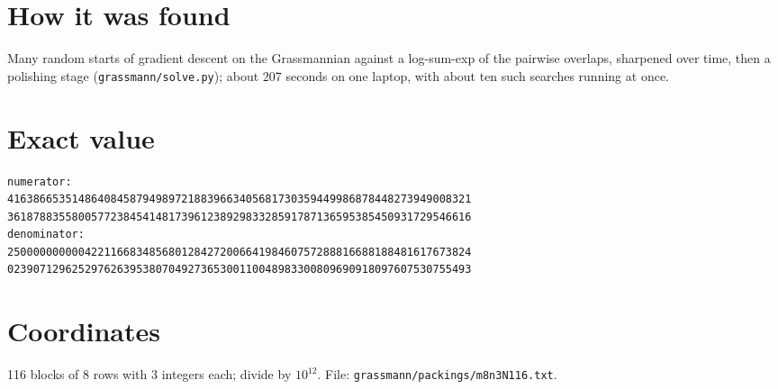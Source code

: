 \documentclass[11pt,a4paper]{article}
\begin{document}
\section{How it was found}
Many random starts of gradient descent on the Grassmannian against a log-sum-exp of the pairwise overlaps, sharpened over time, then a polishing stage (\texttt{grassmann/solve.py}); about 207 seconds on one laptop, with about ten such searches running at once.


\appendix
\section{Exact value}
{\small
\begin{verbatim}
numerator:
416386653514864084587949897218839663405681730359449986878448273949008321
361878835580057723845414817396123892983328591787136595385450931729546616
denominator:
250000000000422116683485680128427200664198460757288816688188481617673824
023907129625297626395380704927365300110048983300809690918097607530755493
\end{verbatim}}

\section{Coordinates}
116 blocks of 8 rows with 3 integers each; divide by $10^{12}$. File: \texttt{grassmann/packings/m8n3N116.txt}.
{\tiny
\begin{multicols}{3}
\end{multicols}}
\end{document}
